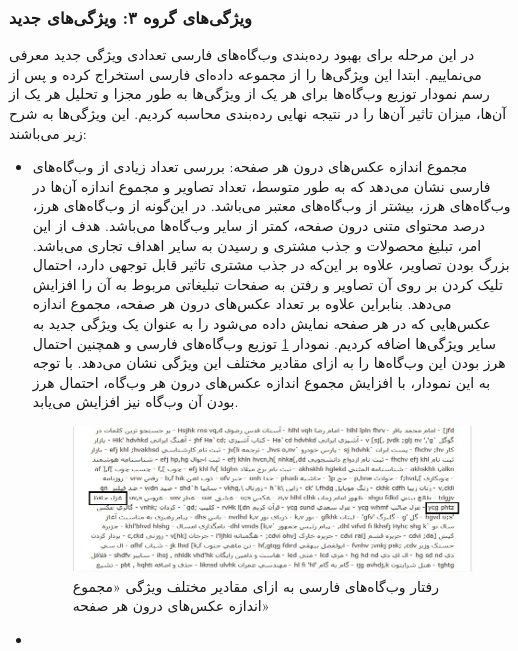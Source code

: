 \documentclass[twoside, a4paper,11pt]{book}
\numberwithin{equation}{chapter}
\numberwithin{table}{chapter}
\numberwithin{figure}{chapter}
\numberwithin{equation}{chapter}
\begin{document}
\subsubsection{ویژگی‌های گروه ۳: ویژگی‌های جدید}
در این مرحله برای بهبود رده‌بندی وب‌گاه‌های فارسی تعدادی ویژگی جدید معرفی می‌نماییم. ابتدا این ویژگی‌ها را از مجموعه داده‌ای فارسی استخراج کرده و پس از رسم نمودار توزیع وب‌گاه‌ها برای هر یک از ویژگی‌ها به طور مجزا و تحلیل هر یک از آن‌‌ها، میزان تاثیر آن‌‌ها را در نتیجه نهایی رده‌بندی محاسبه کردیم. این ویژگی‌ها به شرح زیر می‌باشند:
\begin{itemize}
\item
مجموع اندازه عکس‌های درون هر صفحه: بررسی تعداد زیادی از وب‌گاه‌های فارسی نشان می‌دهد که به طور متوسط، تعداد تصاویر و مجموع اندازه آن‌ها در وب‌گاه‌های هرز، بیشتر از وب‌گاه‌های معتبر می‌باشد. در این‌گونه از وب‌گاه‌های هرز، درصد محتوای متنی درون صفحه، کمتر از سایر وب‌گاه‌ها می‌باشد. هدف از این امر، تبلیغ محصولات و جذب مشتری و رسیدن به سایر اهداف تجاری می‌باشد. بزرگ بودن تصاویر، علاوه بر این‌که در جذب مشتری تاثیر قابل توجهی دارد، احتمال تلیک کردن بر روی آن تصاویر و رفتن به صفحات تبلیغاتی مربوط به آن را افزایش می‌دهد. بنابراین علاوه بر تعداد عکس‌های درون هر صفحه، مجموع اندازه عکس‌هایی که در هر صفحه نمایش داده می‌شود را به عنوان یک ویژگی جدید به سایر ویژگی‌ها اضافه کردیم. نمودار \ref{fig:plot1} توزیع وب‌گاه‌های فارسی و همچنین احتمال هرز بودن این وب‌گاه‌ها را به ازای مقادیر مختلف این ویژگی نشان می‌دهد. با توجه به این نمودار، با افزایش مجموع اندازه عکس‌های درون هر وب‌گاه، احتمال هرز بودن آن وب‌گاه نیز افزایش می‌یابد.
\begin{figure}
\centering
\includegraphics[scale=0.7]{Figures/plot1.png}
\caption{\label{fig:plot1}
رفتار وب‌گاه‌های فارسی به ازای مقادیر مختلف ویژگی «مجموع اندازه عکس‌های درون هر صفحه»
}
\end{figure}
\item

\end{itemize}
\end{document}
